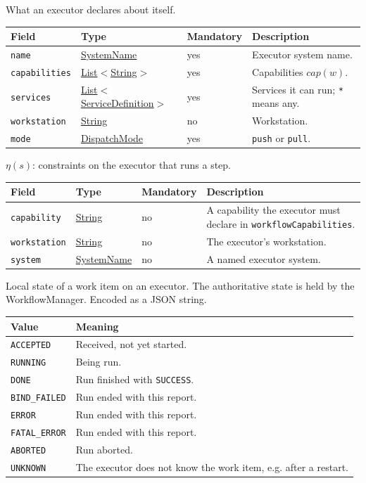 \documentclass[a4paper]{arrowhead}
\newcommand{\mref}[1]{{\textcolor{ArrowheadPurple}{\hyperref[sec:model:#1]{#1}}}}
\newcommand{\pref}[1]{{\textcolor{ArrowheadGrey}{\hyperref[sec:model:primitives:#1]{#1}}}}
\begin{document}
What an executor declares about itself.

{\small
\begin{longtable}{|p{3.7cm}|p{4.2cm}|p{1.6cm}|p{6.3cm}|}

\hline
\rowcolor{gray!33} Field & Type & Mandatory & Description \\ \hline
\endhead
\texttt{name} & \pref{SystemName} & yes & Executor system name. \\ \hline
\texttt{capabilities} & \pref{List}$<$\pref{String}$>$ & yes & Capabilities $cap(w)$. \\ \hline
\texttt{services} & \pref{List}$<$\pref{ServiceDefinition}$>$ & yes & Services it can run; \texttt{*} means any. \\ \hline
\texttt{workstation} & \pref{String} & no & Workstation. \\ \hline
\texttt{mode} & \mref{DispatchMode} & yes & \texttt{push} or \texttt{pull}. \\ \hline
\end{longtable}
}

$\eta(s)$: constraints on the executor that runs a step.

{\small
\begin{longtable}{|p{3.7cm}|p{4.2cm}|p{1.6cm}|p{6.3cm}|}

\hline
\rowcolor{gray!33} Field & Type & Mandatory & Description \\ \hline
\endhead
\texttt{capability} & \pref{String} & no & A capability the executor must declare in \texttt{workflow\allowbreak{}Capabilities}. \\ \hline
\texttt{workstation} & \pref{String} & no & The executor's workstation. \\ \hline
\texttt{system} & \pref{SystemName} & no & A named executor system. \\ \hline
\end{longtable}
}

Local state of a work item on an executor. The authoritative state is held by the WorkflowManager.
 Encoded as a JSON string.
{\small
\begin{longtable}{|p{3.9cm}|p{11.9cm}|}

\hline
\rowcolor{gray!33} Value & Meaning \\ \hline
\endhead
\texttt{ACCEPTED} & Received, not yet started. \\ \hline
\texttt{RUNNING} & Being run. \\ \hline
\texttt{DONE} & Run finished with \texttt{SUCCESS}. \\ \hline
\texttt{BIND\_FAILED} & Run ended with this report. \\ \hline
\texttt{ERROR} & Run ended with this report. \\ \hline
\texttt{FATAL\_ERROR} & Run ended with this report. \\ \hline
\texttt{ABORTED} & Run aborted. \\ \hline
\texttt{UNKNOWN} & The executor does not know the work item, e.g. after a restart. \\ \hline
\end{longtable}
}
\end{document}
